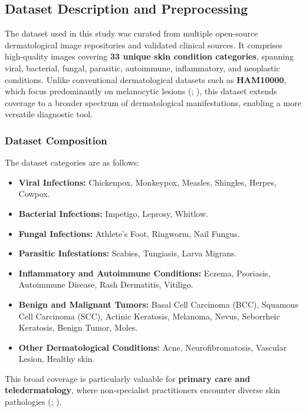 \documentclass[
  12pt,
  oneside]{article}
\providecommand{\tightlist}{%
  \setlength{\itemsep}{0pt}\setlength{\parskip}{0pt}}
\begin{document}
\subsection{Dataset Description and
Preprocessing}\label{dataset-description-and-preprocessing}

The dataset used in this study was curated from multiple open-source
dermatological image repositories and validated clinical sources. It
comprises high-quality images covering \textbf{33 unique skin condition
categories}, spanning viral, bacterial, fungal, parasitic, autoimmune,
inflammatory, and neoplastic conditions. Unlike conventional
dermatological datasets such as \textbf{HAM10000}, which focus
predominantly on melanocytic lesions (; ), this dataset extends coverage to a broader spectrum of
dermatological manifestations, enabling a more versatile diagnostic
tool.

\subsubsection{Dataset Composition}\label{dataset-composition}

The dataset categories are as follows:

\begin{itemize}
\tightlist
\item
  \textbf{Viral Infections:} Chickenpox, Monkeypox, Measles, Shingles,
  Herpes, Cowpox.
\item
  \textbf{Bacterial Infections:} Impetigo, Leprosy, Whitlow.
\item
  \textbf{Fungal Infections:} Athlete's Foot, Ringworm, Nail Fungus.
\item
  \textbf{Parasitic Infestations:} Scabies, Tungiasis, Larva Migrans.
\item
  \textbf{Inflammatory and Autoimmune Conditions:} Eczema, Psoriasis,
  Autoimmune Disease, Rash Dermatitis, Vitiligo.
\item
  \textbf{Benign and Malignant Tumors:} Basal Cell Carcinoma (BCC),
  Squamous Cell Carcinoma (SCC), Actinic Keratosis, Melanoma, Nevus,
  Seborrheic Keratosis, Benign Tumor, Moles.
\item
  \textbf{Other Dermatological Conditions:} Acne, Neurofibromatosis,
  Vascular Lesion, Healthy skin.
\end{itemize}

This broad coverage is particularly valuable for \textbf{primary care
and teledermatology}, where non-specialist practitioners encounter
diverse skin pathologies (; ).
\end{document}
